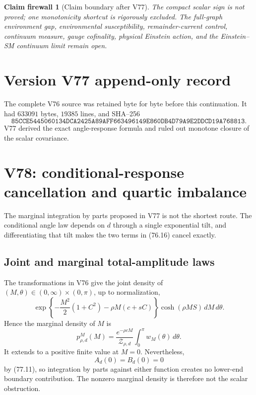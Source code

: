 \documentclass[11pt]{article}
\newtheorem{firewall}[theorem]{Claim firewall}
\theoremstyle{remark}
\begin{document}
\begin{firewall}[Claim boundary after V77]
\label{fire:v17v77}
The compact scalar sign is not proved; one monotonicity shortcut is
rigorously excluded.  The full-graph environment gap, environmental
susceptibility, remainder-current control, continuum measure, gauge
cofinality, physical Einstein action, and the Einstein--SM continuum
limit remain open.
\end{firewall}

\section*{Version V77 append-only record}
The complete V76 source was retained byte for byte before this
continuation.  It had \(633091\) bytes, \(19385\) lines, and SHA--256
\[
 \texttt{85CCE5445060134DCA2425A89AFF663496149E860DB4D79A9E2DDCD19A768813}.
\]
V77 derived the exact angle-response formula and ruled out monotone
closure of the scalar covariance.


\section{V78: conditional-response cancellation and quartic imbalance}
\label{sec:v17v78}

The marginal integration by parts proposed in V77 is not the shortest
route.  The conditional angle law depends on \(d\) through a single
exponential tilt, and differentiating that tilt makes the two terms in
(76.16) cancel exactly.

\subsection{Joint and marginal total-amplitude laws}

The transformations in V76 give the joint density of
\((M,\theta)\in(0,\infty)\times(0,\pi)\), up to normalization,
\[
\boxed{
 \exp\left\{-\frac{M^2}{2}(1+C^2)
 -\rho M(c+sC)\right\}\cosh(\rho MS)\,dM\,d\theta.}              \tag{78.1}
\]
Hence the marginal density of \(M\) is
\[
 p_{\rho,d}^M(M)
 =\frac{e^{-\rho cM}}{\mathcal Z_{\rho,d}}
 \int_0^\pi w_M(\theta)\,d\theta.                \tag{78.2}
\]
It extends to a positive finite value at \(M=0\).  Nevertheless,
\[
 A_d(0)=B_d(0)=0                                  \tag{78.3}
\]
by (77.11), so integration by parts against either function creates
no lower-end boundary contribution.  The nonzero marginal density is
therefore not the scalar obstruction.
\end{document}
